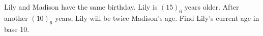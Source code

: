 Lily and Madison have the same birthday. Lily is $(15)_6 $ years older. After another $(10)_6 $ years, Lily will be twice Madison's age. Find Lily's current age in base 10.
